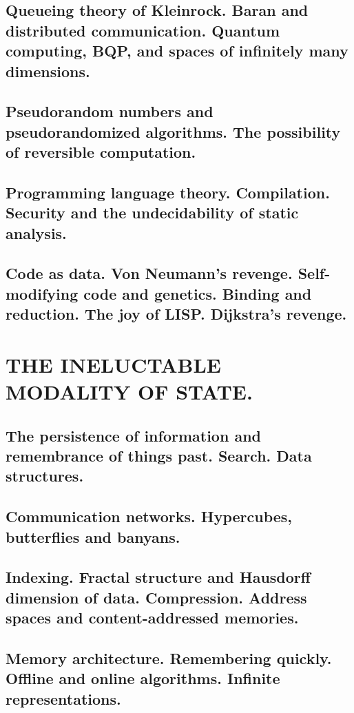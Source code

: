 \documentclass[letterpaper,draft]{memoir}
\begin{document}
\chapter{Queueing theory of Kleinrock. Baran and distributed communication. Quantum
computing, BQP, and spaces of infinitely many dimensions.}

\chapter{Pseudorandom numbers and pseudorandomized algorithms. The possibility of
reversible computation.}

\chapter{Programming language theory. Compilation. Security and the undecidability of
static analysis.}

\chapter{Code as data. Von Neumann's revenge. Self-modifying code and genetics.
Binding and reduction. The joy of LISP. Dijkstra's revenge.}

\part{THE INELUCTABLE MODALITY OF STATE.}

\chapter{The persistence of information and remembrance of things past. Search. Data structures.}

\chapter{Communication networks. Hypercubes, butterflies and banyans.}

\chapter{Indexing. Fractal structure and Hausdorff dimension of data. Compression.
Address spaces and content-addressed memories.}

\chapter{Memory architecture. Remembering quickly. Offline and online algorithms.
Infinite representations.}
\end{document}
